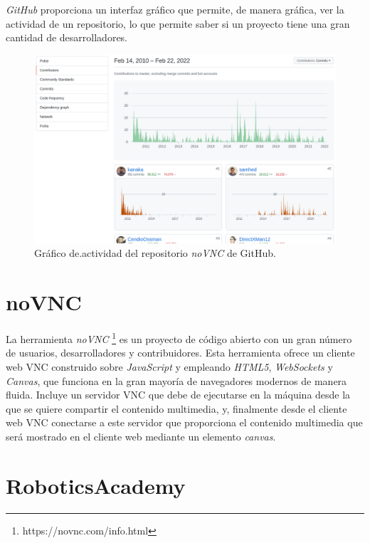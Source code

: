 \documentclass[a4paper, 12pt]{book}
\begin{document}
\emph{GitHub} proporciona un interfaz gráfico que permite, de manera gráfica, ver la actividad de un repositorio, lo que permite saber si un proyecto tiene una gran cantidad de desarrolladores.

\begin{figure}[H]
	\centering
    \includegraphics[width=15cm]{img/github_contributors.png}
    \caption{Gráfico de.actividad del repositorio \emph{noVNC} de GitHub.}
    \label{figura:simulador_gazebo}
\end{figure}

\section{noVNC}
\label{section:novnc}

La herramienta \emph{noVNC} \footnote{https://novnc.com/info.html} es un proyecto de código abierto con un gran número de usuarios, desarrolladores y contribuidores. Esta herramienta ofrece un cliente web VNC construido sobre \emph{JavaScript} y empleando \emph{HTML5}, \emph{WebSockets} y \emph{Canvas}, que funciona en la gran mayoría de navegadores modernos de manera fluida. Incluye un servidor VNC que debe de ejecutarse en la máquina desde la que se quiere compartir el contenido multimedia, y, finalmente desde el cliente web VNC conectarse a este servidor que proporciona el contenido multimedia que será mostrado en el cliente web mediante un elemento \emph{canvas}.

\section{RoboticsAcademy}
\label{section:roboticsacademy}
\end{document}
